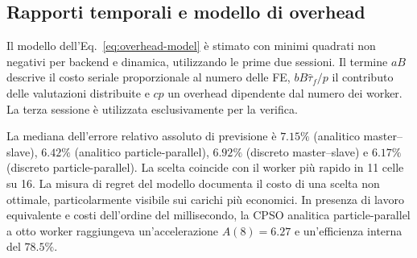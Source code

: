\subsection{Rapporti temporali e modello di overhead}

Il modello dell'Eq.~\eqref{eq:overhead-model} è stimato con minimi quadrati non negativi per backend e dinamica, utilizzando le prime due sessioni. Il termine $aB$ descrive il costo seriale proporzionale al numero delle FE, $bB\widehat\tau_f/p$ il contributo delle valutazioni distribuite e $cp$ un overhead dipendente dal numero dei worker. La terza sessione è utilizzata esclusivamente per la verifica.


La mediana dell'errore relativo assoluto di previsione è $7.15\%$ (analitico master--slave), $6.42\%$ (analitico particle-parallel), $6.92\%$ (discreto master--slave) e $6.17\%$ (discreto particle-parallel). La scelta coincide con il worker più rapido in 11 celle su 16. La misura di regret del modello documenta il costo di una scelta non ottimale, particolarmente visibile sui carichi più economici. In presenza di lavoro equivalente e costi dell'ordine del millisecondo, la CPSO analitica particle-parallel a otto worker raggiungeva un'accelerazione $A(8)=6.27$ e un'efficienza interna del $78.5\%$.
\FloatBarrier
